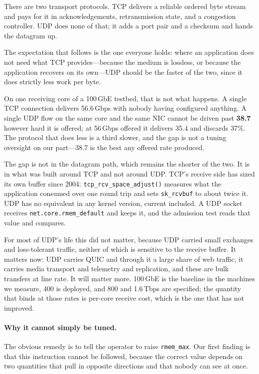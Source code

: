 \documentclass[letterpaper,twocolumn,10pt]{article}
\newcommand{\rmemmax}{\texttt{rmem\_max}\xspace}
\newcommand{\rcvbuf}{\texttt{sk\_rcvbuf}\xspace}
\begin{document}
There are two transport protocols. TCP delivers a reliable ordered byte stream
and pays for it in acknowledgements, retransmission state, and a congestion
controller. UDP does none of that; it adds a port pair and a checksum and hands
the datagram up.

The expectation that follows is the one everyone holds: where an application does
not need what TCP provides---because the medium is lossless, or because the
application recovers on its own---UDP should be the faster of the two, since it
does strictly less work per byte.

On one receiving core of a 100\,GbE testbed, that is not what happens. A single
TCP connection delivers 56.6\,Gbps with nobody having configured anything. A
single UDP flow on the same core and the same NIC cannot be driven past
\textbf{38.7} however hard it is offered; at 56\,Gbps offered it delivers 35.4
and discards 37\%. The protocol that does less is a third slower, and the gap is
not a tuning oversight on our part---38.7 is the best any offered rate produced.

The gap is not in the datagram path, which remains the shorter of the two. It is
in what was built around TCP and not around UDP. TCP's receive side has sized
its own buffer since 2004: \texttt{tcp\_rcv\_space\_adjust()} measures what the
application consumed over one round trip and sets \rcvbuf to about twice it. UDP
has no equivalent in any kernel version, current included. A UDP socket receives
\texttt{net.core.rmem\_default} and keeps it, and the admission test reads that
value and compares.

For most of UDP's life this did not matter, because UDP carried small exchanges
and loss-tolerant traffic, neither of which is sensitive to the receive buffer.
It matters now: UDP carries QUIC and through it a large share of web traffic, it
carries media transport and telemetry and replication, and these are bulk
transfers at line rate. It will matter more. 100\,GbE is the baseline in the
machines we measure, 400 is deployed, and 800 and 1.6\,Tbps are specified; the
quantity that binds at those rates is per-core receive cost, which is the one
that has not improved.

\paragraph{Why it cannot simply be tuned.} The obvious remedy is to tell the
operator to raise \rmemmax. Our first finding is that this instruction cannot be
followed, because the correct value depends on two quantities that pull in
opposite directions and that nobody can see at once.
\end{document}
